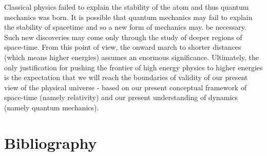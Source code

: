 Classical physics failed to explain the stability of the atom and thus quantum mechanics
was born. It is possible that quantum mechanics may fail to explain the stability of spacetime and so a new form of mechanics may. be necessary. Such new discoveries may come only through the study of deeper regions of space-time. From this point of view, the
onward march to shorter distances (which means higher energies) assumes an enormous
significance. Ultimately, the only justification for pushing the frontier of high energy
physics to higher energies is the expectation that we will reach the boundaries of validity
of our present view of the physical universe - based on our present conceptual framework
of space-time (namely relativity) and our present understanding of dynamics (namely
quantum mechanics). 

\section*{Bibliography}

